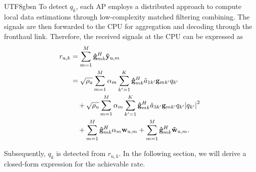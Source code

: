 \documentclass[lettersize,journal]{IEEEtran}
\begin{document}
\begin{CJK}{UTF8}{gbsn}
To detect $q_k$, each AP employs a distributed approach to compute local data estimations through low-complexity matched filtering combining. The signals are then forwarded to the CPU for aggregation and decoding through the fronthaul link. Therefore, the received signals at the CPU can be expressed as
\begin{align}\label{eqn-14}
{r_{\text{u},k}} &= \sum_{m = 1}^M {\bf{\hat{g}}}_{mk}^H{{{\bf{\tilde y}}}_{\text{u},m}}\nonumber\\
& = \sqrt {{\rho _\text{u}}}  \sum_{m = 1}^M {\alpha _m}\sum_{k' = 1}^K {\bf{\hat g}}_{mk}^H{\tilde{a}_{1k'}}{{\bf{g}}_{mk'}}q_{k'}  
\nonumber\\& \quad+ \sqrt {{\rho _\text{u}}} \sum_{m = 1}^M {\alpha _m}\sum_{k' = 1}^K {\bf{\hat g}}_{mk}^H{\tilde{a}_{3k'}}{{\bf{g}}_{mk'}}q_{k'} {\left| {q_{k'} } \right|^2}
 \nonumber\\& \quad+ \sum_{m = 1}^M {\bf{\hat g}}_{mk}^H{\alpha _m}{{\bf{w}}_{\text{u},m}} + \sum_{m = 1}^M {{{\bf{\hat g}}}^H_{mk}}{{{\bf{\tilde w}}}_{\text{u},m}}.
\end{align}

Subsequently, $q_k$ is detected from $r_{\text{u},k}$. In the following section, we will derive a closed-form expression for the achievable rate.


\end{CJK}
\end{document}
